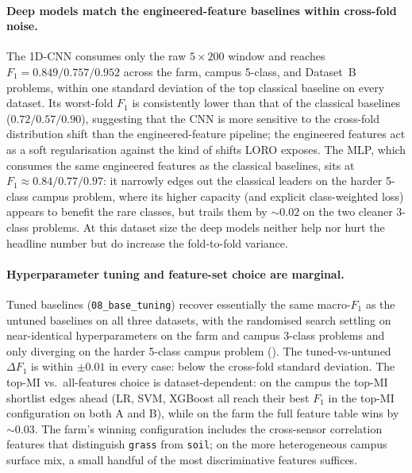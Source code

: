 \vspace{-8mm}
\paragraph{Deep models match the engineered-feature baselines within cross-fold noise.}
The 1D-CNN consumes only the raw $5 \times 200$ window and reaches $F_1 = 0.849 / 0.757 / 0.952$ across the farm, campus 5-class, and Dataset~B problems, within one standard deviation of the top classical baseline on every dataset. Its worst-fold $F_1$ is consistently lower than that of the classical baselines ($0.72 / 0.57 / 0.90$), suggesting that the CNN is more sensitive to the cross-fold distribution shift than the engineered-feature pipeline; the engineered features act as a soft regularisation against the kind of shifts LORO exposes. The MLP, which consumes the same engineered features as the classical baselines, sits at $F_1 \approx 0.84 / 0.77 / 0.97$: it narrowly edges out the classical leaders on the harder 5-class campus problem, where its higher capacity (and explicit class-weighted loss) appears to benefit the rare classes, but trails them by $\sim 0.02$ on the two cleaner 3-class problems. At this dataset size the deep models neither help nor hurt the headline number but do increase the fold-to-fold variance.

\paragraph{Hyperparameter tuning and feature-set choice are marginal.}
Tuned baselines (\texttt{08\_b\allowbreak ase\_tuning}) recover essentially the same macro-$F_1$ as the untuned baselines on all three datasets, with the randomised search settling on near-identical hyperparameters on the farm and campus 3-class problems and only diverging on the harder 5-class campus problem (). The tuned-vs-untuned $\Delta F_1$ is within $\pm 0.01$ in every case: below the cross-fold standard deviation. The top-MI vs.\ all-features choice is dataset-dependent: on the campus the top-MI shortlist edges ahead (LR, SVM, XGBoost all reach their best $F_1$ in the top-MI configuration on both A and B), while on the farm the full feature table wins by $\sim 0.03$. The farm's winning configuration includes the cross-sensor correlation features that distinguish \texttt{grass} from \texttt{soil}; on the more heterogeneous campus surface mix, a small handful of the most discriminative features suffices.

